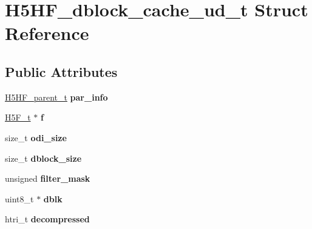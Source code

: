\hypertarget{struct_h5_h_f__dblock__cache__ud__t}{}\section{H5\+H\+F\+\_\+dblock\+\_\+cache\+\_\+ud\+\_\+t Struct Reference}
\label{struct_h5_h_f__dblock__cache__ud__t}
\subsection*{Public Attributes}
\begin{DoxyCompactItemize}
\item 
\mbox{\label{struct_h5_h_f__dblock__cache__ud__t_a5516d15fc2db0886527e9e5d15af67db}} 
\hyperlink{struct_h5_h_f__parent__t}{H5\+H\+F\+\_\+parent\+\_\+t} {\bfseries par\+\_\+info}
\item 
\mbox{\label{struct_h5_h_f__dblock__cache__ud__t_aec2feff06b21a32951d5318dd4936141}} 
\hyperlink{struct_h5_f__t}{H5\+F\+\_\+t} $\ast$ {\bfseries f}
\item 
\mbox{\label{struct_h5_h_f__dblock__cache__ud__t_ae962cb5854b4eb3f1b3ae5c1779bbf80}} 
size\+\_\+t {\bfseries odi\+\_\+size}
\item 
\mbox{\label{struct_h5_h_f__dblock__cache__ud__t_a1322c008c3e89b8c93c260e4937da263}} 
size\+\_\+t {\bfseries dblock\+\_\+size}
\item 
\mbox{\label{struct_h5_h_f__dblock__cache__ud__t_a1b21b8966e09cfb0db4e76d484f4d5ff}} 
unsigned {\bfseries filter\+\_\+mask}
\item 
\mbox{\label{struct_h5_h_f__dblock__cache__ud__t_a2cc8f429c444e7fab23cda8d66d2991e}} 
uint8\+\_\+t $\ast$ {\bfseries dblk}
\item 
\mbox{\label{struct_h5_h_f__dblock__cache__ud__t_a9ccfbd3b963646cc62bb2e362d6df0b2}} 
htri\+\_\+t {\bfseries decompressed}
\end{DoxyCompactItemize}


